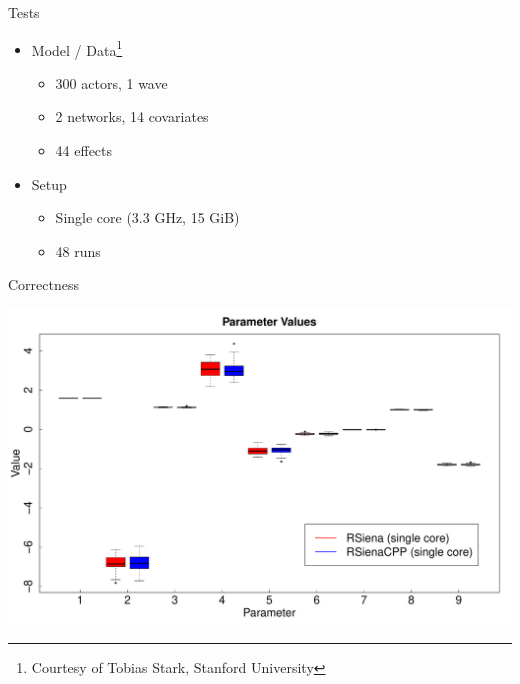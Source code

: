 \documentclass[]{beamer}                                                %
\begin{document}
\begin{frame}%
\end{frame}
\begin{frame}{Tests}                                                    %
  \begin{itemize}
    \item Model / Data\footnote{Courtesy of Tobias Stark, Stanford University}
      \begin{itemize}
        \item 300 actors, 1 wave
        \item 2 networks, 14 covariates
        \item 44 effects
      \end{itemize}
    \item Setup
      \begin{itemize}
        \item Single core (3.3 GHz, 15 GiB)
        \item 48 runs
      \end{itemize}
  \end{itemize}
\end{frame}
\begin{frame}{Correctness}                                              %
  \begin{center}
    \includegraphics[width=\textwidth]{theta}
  \end{center}
\end{frame}
\end{document}
